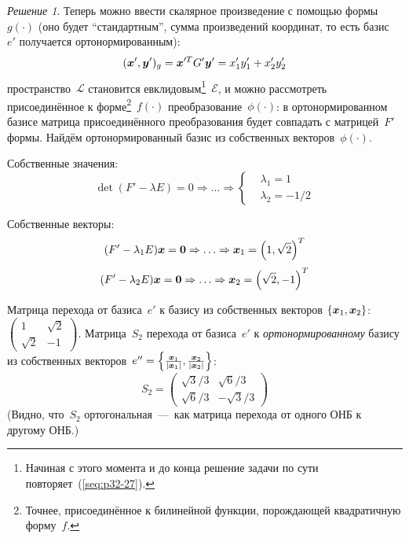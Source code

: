 \documentclass[a4paper,12pt]{article}
\theoremstyle{remark}
\newtheorem*{finalsolution}{Решение}
\begin{document}
\begin{finalsolution}
    Теперь можно ввести скалярное произведение с помощью формы~$g(\cdot)$ (оно будет ``стандартным'', сумма произведений координат, то есть базис~$e'$ получается ортонормированным):
    \[
      (\boldsymbol x', \boldsymbol y')_g = \boldsymbol x^{\prime T} G' \boldsymbol y' = x_1' y_1' + x_2' y_2'
    \]
    пространство~$\mathcal L$ становится евклидовым\footnote{Начиная с этого момента и до конца решение задачи по сути повторяет~(\ref{seq:p32-27}).}~$\mathcal E$, и можно рассмотреть присоединённое к форме\footnote{Точнее, присоединённое к билинейной функции, порождающей квадратичную форму~$f$.}~$f(\cdot)$ преобразование~$\phi(\cdot)$: в ортонормированном базисе матрица присоединённого преобразования будет совпадать с матрицей~$F'$ формы.
    Найдём ортонормированный базис из собственных векторов~$\phi(\cdot)$.
    
    Собственные значения:
    \[
      \det (F' - \lambda E) = 0 \Rightarrow \ldots \Rightarrow \left\{
        \begin{aligned}
          &\lambda_1 = 1\\
          &\lambda_2 = -1/2
        \end{aligned}
      \right.
    \]
    
    Собственные векторы:
    \[
      (F' - \lambda_1 E) \boldsymbol x = \boldsymbol 0 \Rightarrow \ldots \Rightarrow \boldsymbol x_1 = \left(1, \sqrt{2}\right)^T
    \]
    \[
      (F' - \lambda_2 E) \boldsymbol x = \boldsymbol 0 \Rightarrow \ldots \Rightarrow \boldsymbol x_2 = \left(\sqrt{2}, -1\right)^T
    \]
    
    Матрица перехода от базиса~$e'$ к базису из собственных векторов $\{\boldsymbol x_1, \boldsymbol x_2\}$: $\left(\begin{smallmatrix} 1 & \sqrt{2} \\ \sqrt{2} & -1\end{smallmatrix}\right)$.
    Матрица~$S_2$ перехода от базиса~$e'$ к \emph{ортонормированному} базису из собственных векторов~$e'' \hm= \left\{\frac{\bds x_1}{|\bds x_1|}, \frac{\bds x_2}{|\bds x_2|}\right\}$:
    \[
      S_2 = \begin{pmatrix}
        \sqrt{3} \big/ 3 & \sqrt{6} \big/ 3\\
        \sqrt{6} \big/ 3 & -\sqrt{3} \big/ 3
      \end{pmatrix}
    \]
    (Видно, что~$S_2$ ортогональная~---~как матрица перехода от одного ОНБ к другому ОНБ.)
    

\end{finalsolution}
\end{document}
